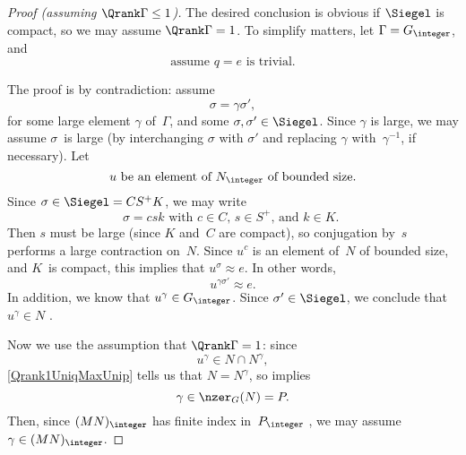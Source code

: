 \begin{proof}[Proof \normalfont (assuming $\Qrank \Gamma \le 1$)]
The desired conclusion is obvious if $\Siegel$ is compact, so we may assume $\Qrank \Gamma = 1$. To simplify matters, let $\Gamma = G_{\integer}$, and
	$$ \text{assume $q = e$ is trivial.} $$

The proof is by contradiction: assume 
	$$\sigma = \gamma \sigma'  , $$
for some large element $\gamma$ of~$\Gamma$, and some $\sigma, \sigma' \in \Siegel$.
Since $\gamma$ is large, we may assume $\sigma$~is large (by interchanging $\sigma$ with $\sigma'$ and  replacing $\gamma$ with~$\gamma^{-1}$, if necessary).
Let 
	$$ \text{$u$ be an element of $N_{\integer}$ of bounded size.} $$
Since $\sigma \in \Siegel = C S^+ K$, we may write 
	$$ \text{$\sigma = c s k$ with $c \in C$, $s \in S^+$, and $k \in K$. } $$
Then $s$ must be large (since $K$ and~$C$ are compact), so conjugation by~$s$ performs a large contraction on~$N$. 
Since $u^c$ is an element of~$N$ of bounded size, and $K$~is compact, this implies that 
	$u^\sigma \approx e $.
In other words, 
	$$u^{\gamma \sigma'} \approx e .$$
In addition, we know that $u^{\gamma} \in G_{\integer}$. Since $\sigma' \in \Siegel$, we conclude that $u^{\gamma} \in N$ .

Now we use the assumption that $\Qrank \Gamma = 1$: since 
	$$u^\gamma \in N \cap N^\gamma ,$$
\cref{Qrank1UniqMaxUnip} tells us that $N = N^\gamma$, so  implies
	$$ \gamma \in \nzer_G(N) = P .$$
Then, since $(MN)_{\integer}$ has finite index in~$P_{\integer}$ , we may assume $\gamma \in (MN)_{\integer}$.


\end{proof}
